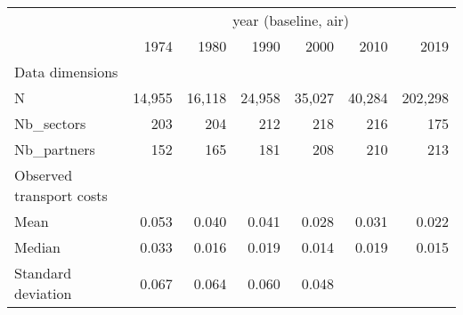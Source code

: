 \begin{tabular}{lllllll}
\cline{1-7}
\multicolumn{1}{c}{} &
  \multicolumn{6}{|c}{year (baseline, air)} \\
\multicolumn{1}{c}{} &
  \multicolumn{1}{|r}{1974} &
  \multicolumn{1}{r}{1980} &
  \multicolumn{1}{r}{1990} &
  \multicolumn{1}{r}{2000} &
  \multicolumn{1}{r}{2010} &
  \multicolumn{1}{r}{2019} \\
\cline{1-7}
\multicolumn{1}{l}{Data dimensions} &
  \multicolumn{1}{|r}{} &
  \multicolumn{1}{r}{} &
  \multicolumn{1}{r}{} &
  \multicolumn{1}{r}{} &
  \multicolumn{1}{r}{} &
  \multicolumn{1}{r}{} \\
\multicolumn{1}{l}{\hspace{1em}N} &
  \multicolumn{1}{|r}{14,955} &
  \multicolumn{1}{r}{16,118} &
  \multicolumn{1}{r}{24,958} &
  \multicolumn{1}{r}{35,027} &
  \multicolumn{1}{r}{40,284} &
  \multicolumn{1}{r}{202,298} \\
\multicolumn{1}{l}{\hspace{1em}Nb\_sectors} &
  \multicolumn{1}{|r}{203} &
  \multicolumn{1}{r}{204} &
  \multicolumn{1}{r}{212} &
  \multicolumn{1}{r}{218} &
  \multicolumn{1}{r}{216} &
  \multicolumn{1}{r}{175} \\
\multicolumn{1}{l}{\hspace{1em}Nb\_partners} &
  \multicolumn{1}{|r}{152} &
  \multicolumn{1}{r}{165} &
  \multicolumn{1}{r}{181} &
  \multicolumn{1}{r}{208} &
  \multicolumn{1}{r}{210} &
  \multicolumn{1}{r}{213} \\
\multicolumn{1}{l}{Observed transport costs} &
  \multicolumn{1}{|r}{} &
  \multicolumn{1}{r}{} &
  \multicolumn{1}{r}{} &
  \multicolumn{1}{r}{} &
  \multicolumn{1}{r}{} &
  \multicolumn{1}{r}{} \\
\multicolumn{1}{l}{\hspace{1em}Mean} &
  \multicolumn{1}{|r}{0.053} &
  \multicolumn{1}{r}{0.040} &
  \multicolumn{1}{r}{0.041} &
  \multicolumn{1}{r}{0.028} &
  \multicolumn{1}{r}{0.031} &
  \multicolumn{1}{r}{0.022} \\
\multicolumn{1}{l}{\hspace{1em}Median} &
  \multicolumn{1}{|r}{0.033} &
  \multicolumn{1}{r}{0.016} &
  \multicolumn{1}{r}{0.019} &
  \multicolumn{1}{r}{0.014} &
  \multicolumn{1}{r}{0.019} &
  \multicolumn{1}{r}{0.015} \\
\multicolumn{1}{l}{\hspace{1em}Standard deviation} &
  \multicolumn{1}{|r}{0.067} &
  \multicolumn{1}{r}{0.064} &
  \multicolumn{1}{r}{0.060} &
  \multicolumn{1}{r}{0.048} &

\end{tabular}
